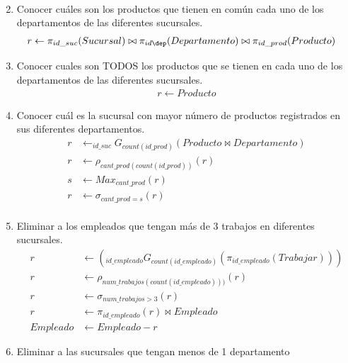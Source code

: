 \documentclass{article}
\begin{document}
\begin{enumerate}
{\begin{align*}
            \end{align*}
        }
        \item {
            Conocer cuáles son los productos que tienen en común cada uno de los
            departamentos de las diferentes sucursales.      
            \begin{align*}
                r &\leftarrow \pi_{id\_suc}(Sucursal) \bowtie \pi_{id\dep}
                (Departamento) \bowtie \pi_{id\_prod}(Producto)
            \end{align*}
        }
        \item {
            Conocer cuales son TODOS los productos que se tienen en cada uno de
            los departamentos de las diferentes sucursales.
            \begin{align*}
                r \leftarrow Producto
            \end{align*}
        }
        \item {
            Conocer cuál es la sucursal con mayor número de productos
            registrados en sus diferentes departamentos.
            \begin{align*}
            r &\leftarrow _{id\_suc}G_{count(id\_prod)}(Producto \bowtie Departamento)\\
            r &\leftarrow \rho_{cant\_prod(count(id\_prod))}(r)\\
            s &\leftarrow Max_{cant\_prod}(r)\\
            r &\leftarrow \sigma_{cant\_prod=s}(r)\\
            \end{align*}
        }
        \item {
            Eliminar a los empleados que tengan más de 3 trabajos en diferentes 
            sucursales.
            \begin{align*}
                r &\leftarrow (_{id\_empleado}G_{count(id\_empleado)}
                (\pi_{id\_empleado}(Trabajar))) \\
                r &\leftarrow \rho_{num\_trabajos(count(id\_empleado)))}(r)\\
                r &\leftarrow \sigma_{num\_trabajos>3}(r)\\
                r &\leftarrow \pi_{id\_empleado}(r) \bowtie Empleado \\
                Empleado &\leftarrow Empleado - r
            \end{align*}
        }
        \item {
            Eliminar a las sucursales que tengan menos de 1 departamento
}
\end{enumerate}
\end{document}
